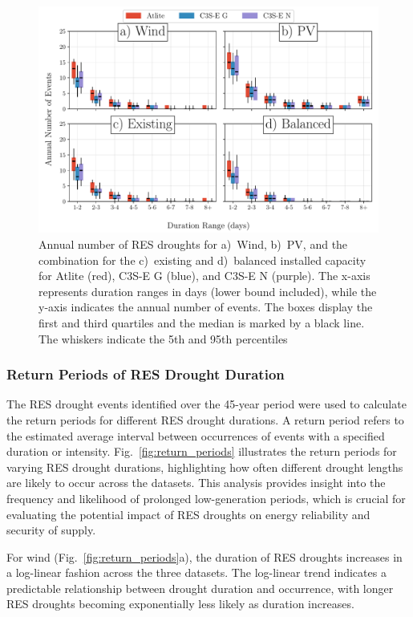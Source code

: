 \documentclass[a4paper, 11pt]{article}
\begin{document}
\begin{figure}[!ht]
	\centering
	\includegraphics[width=\textwidth]{droughts_number_events}
	\caption{Annual number of RES droughts for a)~Wind, b)~PV, and the combination for the c)~existing and d)~balanced installed capacity for Atlite (red), C3S-E G (blue), and C3S-E N (purple). The x-axis represents duration ranges in days (lower bound included), while the y-axis indicates the annual number of events. The boxes display the first and third quartiles and the median is marked by a black line. The whiskers indicate the 5th and 95th percentiles}
	\label{fig:boxplot_number_events}	
\end{figure}

\newpage
\subsubsection{Return Periods of RES Drought Duration}

The RES drought events identified over the 45-year period were used to calculate the return periods for different RES drought durations. A return period refers to the estimated average interval between occurrences of events with a specified duration or intensity. Fig.~\ref{fig:return_periods} illustrates the return periods for varying RES drought durations, highlighting how often different drought lengths are likely to occur across the datasets. This analysis provides insight into the frequency and likelihood of prolonged low-generation periods, which is crucial for evaluating the potential impact of RES droughts on energy reliability and security of supply.

For wind (Fig.~\ref{fig:return_periods}a), the duration of RES droughts increases in a log-linear fashion across the three datasets. The log-linear trend indicates a predictable relationship between drought duration and occurrence, with longer RES droughts becoming exponentially less likely as duration increases. 
\end{document}
